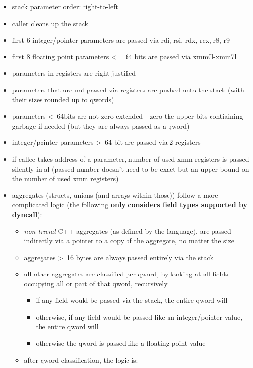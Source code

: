\begin{itemize}
\item stack parameter order: right-to-left
\item caller cleans up the stack
\item first 6 integer/pointer parameters are passed via rdi, rsi, rdx, rcx, r8, r9
\item first 8 floating point parameters \textless=\ 64 bits are passed via xmm0l-xmm7l
\item parameters in registers are right justified
\item parameters that are not passed via registers are pushed onto the stack (with their sizes rounded up to qwords)
\item parameters \textless\ 64bits are not zero extended - zero the upper bits contiaining garbage if needed (but they are always
passed as a qword)
\item integer/pointer parameters \textgreater\ 64 bit are passed via 2 registers
\item if callee takes address of a parameter, number of used xmm registers is passed silently in al (passed number doesn't need to be
exact but an upper bound on the number of used xmm registers)
\item aggregates (structs, unions (and arrays within those)) follow a more complicated logic (the following {\bf only considers field types supported by dyncall}):
\begin{itemize}
  \item {\it non-trivial} C++ aggregates (as defined by the language), are passed indirectly via a pointer to a copy of the aggregate, no matter the size
  \item aggregates \textgreater\ 16 bytes are always passed entirely via the stack
  \item all other aggregates are classified per qword, by looking at all fields occupying all or part of that qword, recursively
  \begin{itemize}
    \item if any field would be passed via the stack, the entire qword will
    \item otherwise, if any field would be passed like an integer/pointer value, the entire qword will
    \item otherwise the qword is passed like a floating point value
  \end{itemize}
  \item after qword classification, the logic is:
  \begin{itemize}

\end{itemize}
\end{itemize}
\end{itemize}
